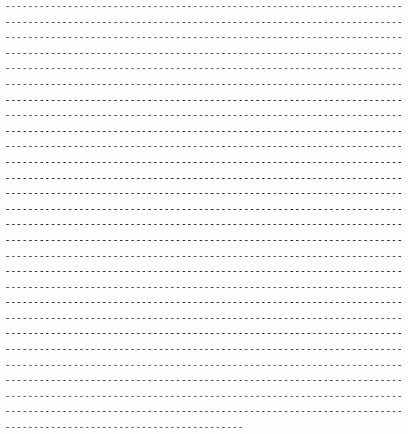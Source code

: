\documentclass[11pt, letterpaper, openany]{book}
\begin{document}
\begin{empiricalbox}
\begin{lstlisting}[style=terminal]
------------------------------------------------------------------------------------------------------------------------------------------------------------------------------------------------------------------------------------------------------------------------------------------------------------------------------------------------------------------------------------------------------------------------------------------------------------------------------------------------------------------------------------------------------------------------------------------------------------------------------------------------------------------------------------------------------------------------------------------------------------------------------------------------------------------------------------------------------------------------------------------------------------------------------------------------------------------------------------------------------------------------------------------------------------------------------------------------------------------------------------------------------------------------------------------------------------------------------------------------------------------------------------------------------------------------------------------------------------------------------------------------------------------------------------------------------------------------------------------------------------------------------------------------------------------------------------------------------------------------------------------------------------------------------------------------------------------------------------------------------------------------------------------------------------------------------------------------------------------------------------------------------------------------------------------------------------------------------------------------------------

\end{lstlisting}
\end{empiricalbox}
\end{document}

